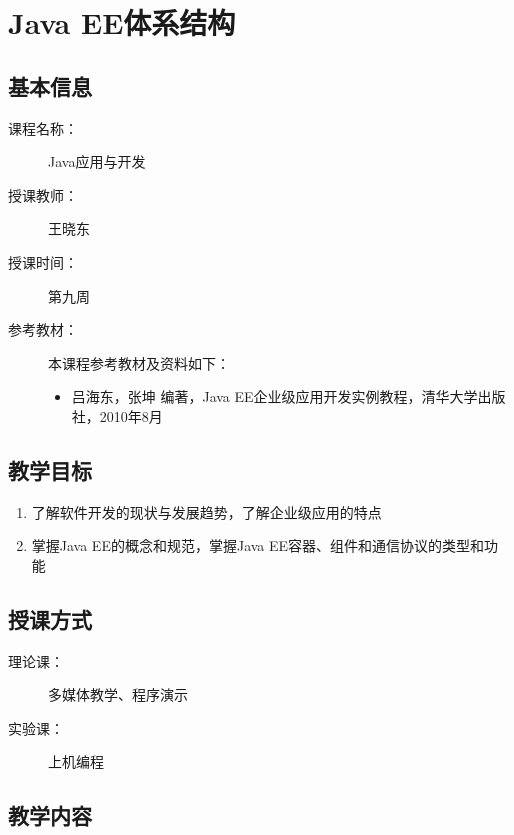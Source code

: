 \chapter{Java EE体系结构}
\label{chp:JavaEE-architecture}

\section*{基本信息}
\sline
\begin{description}
\item[课程名称：] Java应用与开发
\item[授课教师：] 王晓东
\item[授课时间：] 第九周
\item[参考教材：] 本课程参考教材及资料如下：
  \begin{itemize}
  \item 吕海东，张坤 编著，Java EE企业级应用开发实例教程，清华大学出版社，2010年8月
  \end{itemize}
\end{description}

\section*{教学目标}

\sline

\begin{enumerate}
\item 了解软件开发的现状与发展趋势，了解企业级应用的特点
\item 掌握Java EE的概念和规范，掌握Java EE容器、组件和通信协议的类型和功能
\end{enumerate}  

\section*{授课方式}

\sline
\begin{description}
\item[理论课：] 多媒体教学、程序演示
\item[实验课：] 上机编程
\end{description}

\newpage
\section*{教学内容}
\sline


